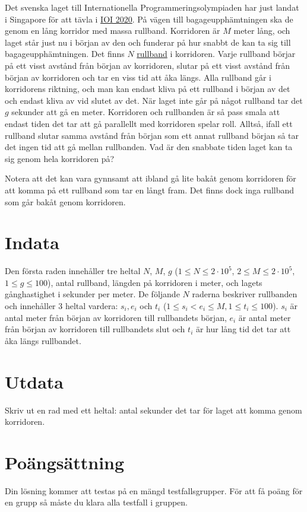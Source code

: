Det svenska laget till Internationella Programmeringsolympiaden har just landat i Singapore för att
tävla i \href{https://ioi2020.sg/}{IOI 2020}.
På vägen till bagageupphämtningen ska de genom en lång korridor med massa rullband.
Korridoren är $M$ meter lång, och laget står just nu i början av den och funderar på
hur snabbt de kan ta sig till bagageupphämtningen.
Det finns $N$ \href{https://sv.wikipedia.org/wiki/Rullande_trottoar}{rullband} i korridoren.
Varje rullband börjar på ett visst avstånd från början av korridoren,
slutar på ett visst avstånd från början av korridoren och tar en viss tid att åka längs.
Alla rullband går i korridorens riktning, och man kan endast kliva på ett rullband i början av det och endast kliva av vid slutet av det.
När laget inte går på något rullband tar det $g$ sekunder att gå en meter.
Korridoren och rullbanden är så pass smala att endast tiden det tar att gå
parallellt med korridoren spelar roll. 
Alltså, ifall ett rullband slutar samma avstånd från början
som ett annat rullband början så tar det ingen tid att gå mellan
rullbanden. Vad är den snabbate tiden laget kan ta sig genom hela korridoren på?

Notera att det kan vara gynnsamt att ibland gå lite bakåt genom korridoren för att komma på
ett rullband som tar en långt fram. Det finns dock inga rullband som går bakåt genom
korridoren.

\section*{Indata}
Den första raden innehåller tre heltal $N$, $M$, $g$ ($1 \le N \le 2 \cdot 10^5$, $2 \le M \le 2 \cdot 10^5$, $1 \le g \le 100$),
antal rullband, längden på korridoren i meter, och lagets gånghastighet i sekunder per meter.
De följande $N$ raderna beskriver rullbanden och innehåller 3 heltal vardera: $s_i, e_i$ och $t_i$
($1\leq s_i < e_i\leq M,1\leq t_i\leq100$).
$s_i$ är antal meter från början av korridoren till rullbandets början, $e_i$ är antal meter
från början av korridoren till rullbandets slut och $t_i$ är hur lång tid det tar att åka längs rullbandet.

\section*{Utdata}
Skriv ut en rad med ett heltal: antal sekunder det tar för laget att komma genom korridoren.

\section*{Poängsättning}
Din lösning kommer att testas på en mängd testfallsgrupper.
För att få poäng för en grupp så måste du klara alla testfall i gruppen.

